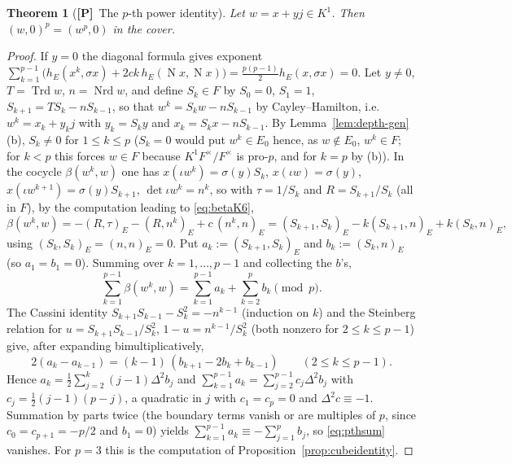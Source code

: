 \documentclass[11pt]{article}
\newcommand{\Nm}{\operatorname N}
\newcommand{\Nrd}{\operatorname{Nrd}}
\newcommand{\Trd}{\operatorname{Trd}}
\newcommand{\Ptag}{\textnormal{\textbf{[P]}}}
\theoremstyle{plain}
\newtheorem{theorem}{Theorem}[section]
\theoremstyle{definition}
\begin{document}
\begin{theorem}[\Ptag\ The $p$-th power identity]\label{thm:pthpower}
Let $w=x+yj\in K^1$.  Then $(w,0)^p=(w^p,0)$ in the cover.
\end{theorem}
\begin{proof}
If $y=0$ the diagonal formula gives exponent
$\sum_{k=1}^{p-1}\bigl(h_E(x^k,\sigma x)+2ck\,h_E(\Nm x,\Nm x)\bigr)=\tfrac{p(p-1)}2h_E(x,\sigma x)=0$.
Let $y\ne0$, $T=\Trd w$, $n=\Nrd w$, and define $S_k\in F$ by
$S_0=0$, $S_1=1$, $S_{k+1}=TS_k-nS_{k-1}$, so that
$w^k=S_kw-nS_{k-1}$ by Cayley--Hamilton, i.e.\ $w^k=x_k+y_kj$ with
$y_k=S_ky$ and $x_k=S_kx-nS_{k-1}$.  By Lemma~\ref{lem:depth-gen}(b),
$S_k\ne0$ for $1\le k\le p$ ($S_k=0$ would put $w^k\in E_0$ hence,
as $w\notin E_0$, $w^k\in F$; for $k<p$ this forces $w\in F$ because
$K^1F^\times/F^\times$ is pro-$p$, and for $k=p$ by (b)).  In the cocycle
$\beta(w^k,w)$ one has $x(\iota w^k)=\sigma(y)S_k$, $x(\iota w)=\sigma(y)$,
$x(\iota w^{k+1})=\sigma(y)S_{k+1}$, $\det\iota w^k=n^k$, so with
$\tau=1/S_k$ and $R=S_{k+1}/S_k$ (all in $F$), by the computation
leading to \eqref{eq:betaK6},
\[
 \beta(w^k,w)=-(R,\tau)_E-(R,n^k)_E+c\,(n^k,n)_E
 =(S_{k+1},S_k)_E-k(S_{k+1},n)_E+k(S_k,n)_E ,
\]
using $(S_k,S_k)_E=(n,n)_E=0$.  Put $a_k:=(S_{k+1},S_k)_E$ and
$b_k:=(S_k,n)_E$ (so $a_1=b_1=0$).  Summing over $k=1,\dots,p-1$ and
collecting the $b$'s,
\begin{equation}\label{eq:pthsum}
 \sum_{k=1}^{p-1}\beta(w^k,w)=\sum_{k=1}^{p-1}a_k+\sum_{k=2}^{p}b_k\pmod p .
\end{equation}
The Cassini identity $S_{k+1}S_{k-1}-S_k^2=-n^{k-1}$ (induction on
$k$) and the Steinberg relation for $u=S_{k+1}S_{k-1}/S_k^2$,
$1-u=n^{k-1}/S_k^2$ (both nonzero for $2\le k\le p-1$) give, after
expanding bimultiplicatively,
\[
 2(a_k-a_{k-1})=(k-1)\,(b_{k+1}-2b_k+b_{k-1})\qquad(2\le k\le p-1).
\]
Hence $a_k=\tfrac12\sum_{j=2}^k(j-1)\Delta^2b_j$ and
$\sum_{k=1}^{p-1}a_k=\sum_{j=2}^{p-1}c_j\Delta^2b_j$ with
$c_j=\tfrac12(j-1)(p-j)$, a quadratic in $j$ with $c_1=c_p=0$ and
$\Delta^2c\equiv-1$.  Summation by parts twice (the boundary terms
vanish or are multiples of $p$, since $c_0=c_{p+1}=-p/2$ and $b_1=0$)
yields $\sum_{k=1}^{p-1}a_k\equiv-\sum_{j=1}^pb_j$, so \eqref{eq:pthsum}
vanishes.  For $p=3$ this is the computation of
Proposition~\ref{prop:cubeidentity}.
\end{proof}
\end{document}
